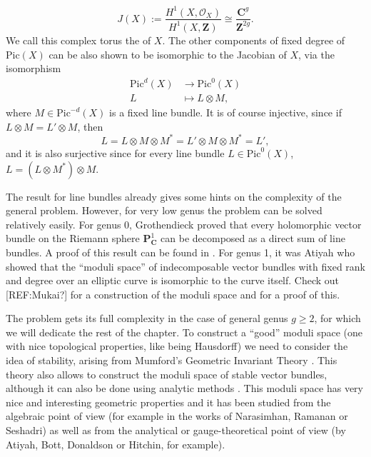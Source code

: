 \documentclass[12pt,a4paper]{book}
\theoremstyle{definition} \newtheorem{defn}[thm]{Definition}
\theoremstyle{definition} \newtheorem{ejemplo}[thm]{Example}
\theoremstyle{remark} \newtheorem*{rem}{Remark}
\def\OO{\mathscr{O}}
\def\CC{\mathbf{C}}
\def\ZZ{\mathbf{Z}}
\def\PP{\mathbf{P}}
\def\Pic{\mathrm{Pic}}
\let\emph\relax
\begin{document}
       \begin{equation*}
J(X):=	 \frac{H^1(X,\OO_X)}{H^1(X,\ZZ)} \cong \frac{\CC^g}{\ZZ^{2g}}.
       \end{equation*}
       We call this complex torus the \emph{Jacobian} of $X$. The other components of fixed degree of $\Pic(X)$ can be also shown to be isomorphic to the Jacobian of $X$, via the isomorphism
       \begin{align*}
	  \Pic^d(X)&\longrightarrow \Pic^0(X)\\ 
	   L &\longmapsto L\otimes M, 
	 \end{align*}
	 where $M \in \Pic^{-d}(X)$ is a fixed line bundle. It is of course injective, since if $L\otimes M = L'\otimes M$, then 
	 \begin{equation*}
	   L=L\otimes M \otimes M^* = L' \otimes M \otimes M^* = L',
	 \end{equation*}
	 and it is also surjective since for every line bundle $L \in \Pic^0(X)$, $L=(L\otimes M^*) \otimes M$.
       
	 The result for line bundles already gives some hints on the complexity of the general problem. However, for very low genus the problem can be solved relatively easily. For genus 0, Grothendieck proved that every holomorphic vector bundle on the Riemann sphere $\PP^1_\CC$ can be decomposed as a direct sum of line bundles. A proof of this result can be found in \cite{hartshorne}. For genus 1, it was Atiyah who showed that the ``moduli space'' of indecomposable vector bundles with fixed rank and degree over an elliptic curve is isomorphic to the curve itself. Check out [REF:Mukai?] for a construction of the moduli space and for a proof of this. 

	 The problem gets its full complexity in the case of general genus $g\geq 2$, for which we will dedicate the rest of the chapter. To construct a ``good'' moduli space (one with nice topological properties, like being Hausdorff) we need to consider the idea of stability, arising from Mumford's Geometric Invariant Theory \cite{git}. This theory also allows to construct the moduli space of stable vector bundles, although it can also be done using analytic methods \cite{kobayashi}. This moduli space has very nice and interesting geometric properties and it has been studied from the algebraic point of view (for example in the works of Narasimhan, Ramanan or Seshadri) as well as from the analytical or gauge-theoretical point of view (by Atiyah, Bott, Donaldson or Hitchin, for example).
\end{document}
